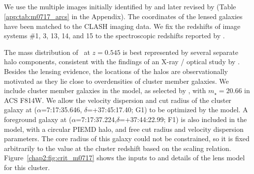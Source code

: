 \subsection{\MACSzeroseven}

We use the multiple images initially identified by \citet{Zitrin:2009qy} and later revised by \citet{Limousin:2012fj} (Table \ref{app:tab:m0717_arcs} in the Appendix). The coordinates of the lensed galaxies have been matched to the CLASH imaging data. We fix the redshifts of image systems \#1, 3, 13, 14, and 15 to the spectroscopic redshifts reported by \citet{Limousin:2012fj}.

The mass distribution of \MACSzeroseven\ at $z=0.545$ is best represented by several separate halo components, consistent with the findings of an X-ray / optical study by \citet{Ma:2009gf}. Besides the lensing evidence, the locations of the halos are observationally motivated as they lie close to overdensities of cluster member galaxies. We include cluster member galaxies in the model, as selected by \citet{Limousin:2012fj}, with $m_\star=20.66$ in ACS F814W. We allow the velocity dispersion and cut radius of the cluster galaxy at ($\alpha$=7:17:35.646, $\delta$=+37:45:17.40; G1) to be optimized by the model. A foreground galaxy at ($\alpha$=7:17:37.224,$\delta$=+37:44:22.99; F1) is also included in the model, with a circular PIEMD halo, and free cut radius and velocity dispersion parameters. The core radius of this galaxy could not be constrained, so it is fixed arbitrarily to the value at the cluster redshift based on the scaling relation. Figure~\ref{chap2:fig:crit_m0717} shows the inputs to and details of the lens model for this cluster.

